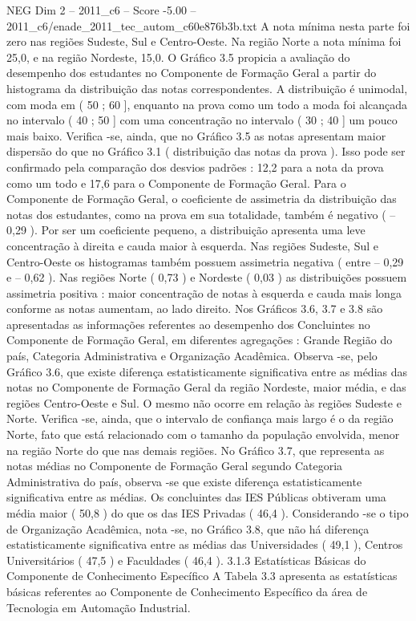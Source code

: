 \begin{textsample}{NEG Dim 2 – 2011\_c6 – Score -5.00 – 2011\_c6/enade\_2011\_tec\_autom\_c60e876b3b.txt}
A nota mínima nesta parte foi zero nas regiões Sudeste, Sul e Centro-Oeste.
Na região Norte a nota mínima foi 25,0, e na região Nordeste, 15,0.
O Gráfico 3.5 propicia a avaliação do desempenho dos estudantes no Componente de Formação Geral a partir do histograma da distribuição das notas correspondentes.
A distribuição é unimodal, com moda em ( 50 ; 60 ], enquanto na prova como um todo a moda foi alcançada no intervalo ( 40 ; 50 ] com uma concentração no intervalo ( 30 ; 40 ] um pouco mais baixo.
Verifica -se, ainda, que no Gráfico 3.5 as notas apresentam maior dispersão do que no Gráfico 3.1 ( distribuição das notas da prova ).
Isso pode ser confirmado pela comparação dos desvios padrões : 12,2 para a nota da prova como um todo e 17,6 para o Componente de Formação Geral.
Para o Componente de Formação Geral, o coeficiente de assimetria da distribuição das notas dos estudantes, como na prova em sua totalidade, também é negativo ( – 0,29 ).
Por ser um coeficiente pequeno, a distribuição apresenta uma leve concentração à direita e cauda maior à esquerda.
Nas regiões Sudeste, Sul e Centro-Oeste os histogramas também possuem assimetria negativa ( entre – 0,29 e – 0,62 ).
Nas regiões Norte ( 0,73 ) e Nordeste ( 0,03 ) as distribuições possuem assimetria positiva : maior concentração de notas à esquerda e cauda mais longa conforme as notas aumentam, ao lado direito.
Nos Gráficos 3.6, 3.7 e 3.8 são apresentadas as informações referentes ao desempenho dos Concluintes no Componente de Formação Geral, em diferentes agregações : Grande Região do país, Categoria Administrativa e Organização Acadêmica.
Observa -se, pelo Gráfico 3.6, que existe diferença estatisticamente significativa entre as médias das notas no Componente de Formação Geral da região Nordeste, maior média, e das regiões Centro-Oeste e Sul.
O mesmo não ocorre em relação às regiões Sudeste e Norte.
Verifica -se, ainda, que o intervalo de confiança mais largo é o da região Norte, fato que está relacionado com o tamanho da população envolvida, menor na região Norte do que nas demais regiões.
No Gráfico 3.7, que representa as notas médias no Componente de Formação Geral segundo Categoria Administrativa do país, observa -se que existe diferença estatisticamente significativa entre as médias.
Os concluintes das IES Públicas obtiveram uma média maior ( 50,8 ) do que os das IES Privadas ( 46,4 ).
Considerando -se o tipo de Organização Acadêmica, nota -se, no Gráfico 3.8, que não há diferença estatisticamente significativa entre as médias das Universidades ( 49,1 ), Centros Universitários ( 47,5 ) e Faculdades ( 46,4 ). 3.1.3 Estatísticas Básicas do Componente de Conhecimento Específico A Tabela 3.3 apresenta as estatísticas básicas referentes ao Componente de Conhecimento Específico da área de Tecnologia em Automação Industrial.

\end{textsample}
